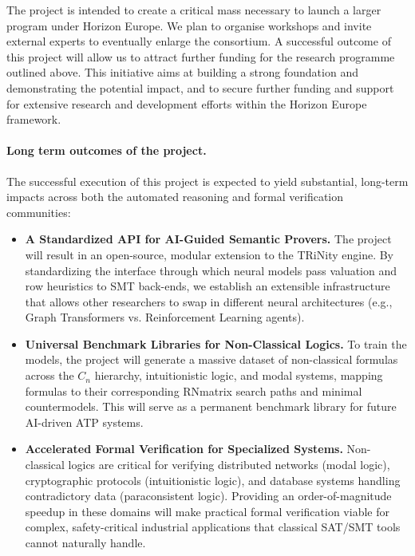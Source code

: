 \documentclass[a4paper]{article}
\begin{document}
The project is intended to create a critical mass necessary to launch a larger program under Horizon Europe. We plan to organise workshops and invite external experts to eventually enlarge the consortium. A successful outcome of this project will allow us to attract further funding for the research programme outlined above.
This initiative aims at building a strong foundation and demonstrating the potential impact,  and to secure further funding and support for extensive research and development efforts within the Horizon Europe framework.


\paragraph{Long term outcomes of the project.} %
The successful execution of this project is expected to yield substantial, long-term impacts across both the automated reasoning and formal verification communities:

\begin{itemize}
    \item \textbf{A Standardized API for AI-Guided Semantic Provers.} The project will result in an open-source, modular extension to the TRiNity engine. By standardizing the interface through which neural models pass valuation and row heuristics to SMT back-ends, we establish an extensible infrastructure that allows other researchers to swap in different neural architectures (e.g., Graph Transformers vs. Reinforcement Learning agents).
    \item \textbf{Universal Benchmark Libraries for Non-Classical Logics.} To train the models, the project will generate a massive dataset of non-classical formulas across the $C_n$ hierarchy, intuitionistic logic, and modal systems, mapping formulas to their corresponding RNmatrix search paths and minimal countermodels. This will serve as a permanent benchmark library for future AI-driven ATP systems.
    \item \textbf{Accelerated Formal Verification for Specialized Systems.} Non-classical logics are critical for verifying distributed networks (modal logic), cryptographic protocols (intuitionistic logic), and database systems handling contradictory data (paraconsistent logic). Providing an order-of-magnitude speedup in these domains will make practical formal verification viable for complex, safety-critical industrial applications that classical SAT/SMT tools cannot naturally handle.
\end{itemize}
\end{document}
